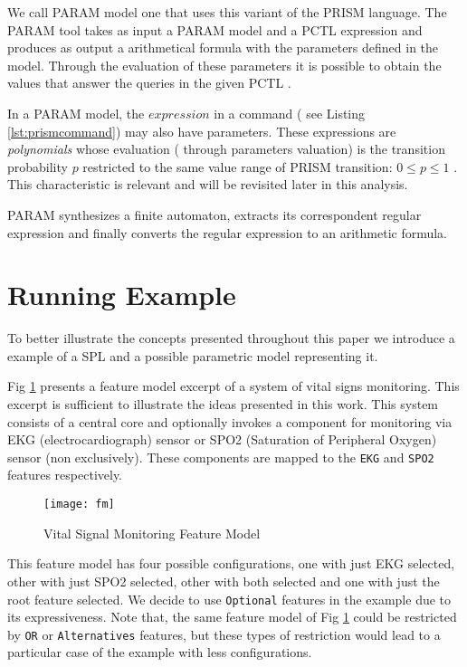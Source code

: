 \documentclass[conference]{IEEEtran}
\begin{document}
	We call PARAM model one that uses this variant of the PRISM language.	
	The PARAM tool takes as input a PARAM model and a PCTL expression and produces as output a
	arithmetical formula with the parameters defined in the model.
	Through the evaluation of these parameters it is possible to obtain the values 
	that answer the queries in the given PCTL \cite{PARAM}.

	In a PARAM model, the $expression$ in a command ( see Listing \ref{lst:prismcommand})
	may also have parameters. These expressions are \textit{polynomials} whose evaluation (
	through parameters valuation) is the transition probability $p$ restricted
	to the same value range of PRISM transition:  $0 \leq p \leq 1$ \cite{greuel}.
	This characteristic is relevant and will be revisited later in this analysis.
		
	PARAM synthesizes
	a finite automaton, extracts its correspondent regular expression and finally
	converts the regular expression  to an arithmetic formula. 
			

\section{Running Example}
\label{sec:example}

	To better illustrate the concepts presented throughout this paper we introduce a  example of a SPL
	and a possible parametric model  representing it.
	
	Fig \ref{fig:fm} presents a feature model excerpt of a system of vital signs monitoring.
	This excerpt is sufficient to illustrate the ideas presented in this work.
	This system consists of a central core and optionally invokes a component for monitoring via EKG (electrocardiograph) sensor or
	SPO2 (Saturation of Peripheral Oxygen) sensor (non exclusively). These components are mapped to the \texttt{EKG} and \texttt{SPO2} 
	features respectively.
	
	\begin{figure}[!h]
	\centering
	\texttt{[image: fm]}
	\caption{Vital Signal Monitoring Feature Model}
	\label{fig:fm}
	\end{figure}
	
	This feature model has four possible configurations, one with just EKG selected, other with just SPO2 selected, other with both selected
	and one with just the root feature selected. We decide to use \texttt{Optional} features in the example due to its expressiveness.
	Note that, the same feature model of Fig \ref{fig:fm} could be restricted by \texttt{OR} or \texttt{Alternatives}  
	features, but these types of restriction would lead to a particular case of the example with less configurations.
	
\end{document}
